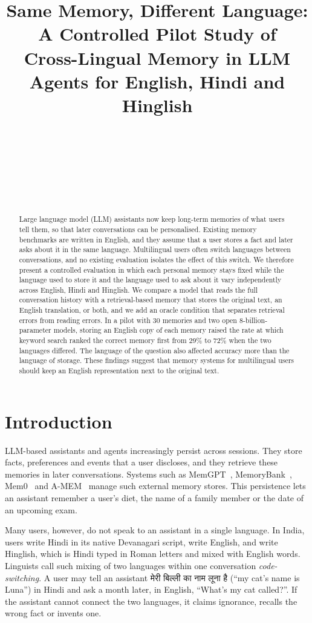 \documentclass[11pt]{article}
\title{Same Memory, Different Language: A Controlled Pilot Study of\\
Cross-Lingual Memory in LLM Agents for English, Hindi and Hinglish}
\author{\TODO{Author 1} \\ \TODO{Institute} \\ \texttt{\TODO{email}} \And
        \TODO{Author 2} \\ \TODO{Institute} \\ \texttt{\TODO{email}} \And
        \TODO{Author 3} \\ \TODO{Institute} \\ \texttt{\TODO{email}}}
\newcommand{\hi}[1]{\foreignlanguage{hindi}{#1}}
\begin{document}
\maketitle

\begin{abstract}
Large language model (LLM) assistants now keep long-term memories of what users tell them, so that later conversations can be personalised.
Existing memory benchmarks are written in English, and they assume that a user stores a fact and later asks about it in the same language.
Multilingual users often switch languages between conversations, and no existing evaluation isolates the effect of this switch.
We therefore present a controlled evaluation in which each personal memory stays fixed while the language used to store it and the language used to ask about it vary independently across English, Hindi and Hinglish.
We compare a model that reads the full conversation history with a retrieval-based memory that stores the original text, an English translation, or both, and we add an oracle condition that separates retrieval errors from reading errors.
In a pilot with 30 memories and two open 8-billion-parameter models, storing an English copy of each memory raised the rate at which keyword search ranked the correct memory first from 29\% to 72\% when the two languages differed.
The language of the question also affected accuracy more than the language of storage.
These findings suggest that memory systems for multilingual users should keep an English representation next to the original text.
\end{abstract}

\section{Introduction}
\label{sec:intro}

LLM-based assistants and agents increasingly persist across sessions.
They store facts, preferences and events that a user discloses, and they retrieve these memories in later conversations.
Systems such as MemGPT~\citep{packer2023memgpt}, MemoryBank~\citep{zhong2024memorybank}, Mem0~\citep{chhikara2025mem0} and A-MEM~\citep{xu2025amem} manage such external memory stores.
This persistence lets an assistant remember a user's diet, the name of a family member or the date of an upcoming exam.

Many users, however, do not speak to an assistant in a single language.
In India, users write Hindi in its native Devanagari script, write English, and write Hinglish, which is Hindi typed in Roman letters and mixed with English words.
Linguists call such mixing of two languages within one conversation \emph{code-switching}.
A user may tell an assistant \hi{मेरी बिल्ली का नाम लूना है} (``my cat's name is Luna'') in Hindi and ask a month later, in English, ``What's my cat called?''.
If the assistant cannot connect the two languages, it claims ignorance, recalls the wrong fact or invents one.
\end{document}
